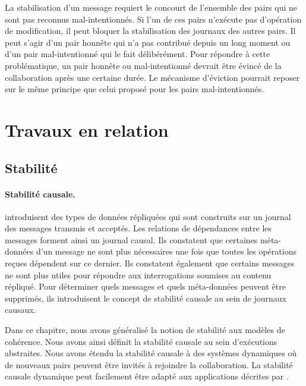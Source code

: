 La stabilisation d'un message requiert le concourt de l'ensemble des pairs qui ne sont pas reconnus mal-intentionnés.
Si l'un de ces pairs n'exécute pas d'opération de modification, il peut bloquer la stabilisation des journaux des autres pairs.
Il peut s'agir d'un pair honnête qui n'a pas contribué depuis un long moment ou d'un pair mal-intentionné qui le fait délibérément.
Pour répondre à cette problématique, un pair honnête ou mal-intentionné devrait être évincé de la collaboration après une certaine durée.
Le mécanisme d'éviction pourrait reposer sur le même principe que celui proposé pour les pairs mal-intentionnés.


\section{Travaux en relation}

\subsection{Stabilité}

\paragraph{Stabilité causale.} \textcite{baquero_2018_pure-op-crdt, baquero_2014_pure-op-crdt} introduisent des types de données répliquées qui sont construits sur un journal des messages transmis et acceptés.
Les relations de dépendances entre les messages forment ainsi un journal causal.
Ils constatent que certaines méta-données d'un message ne sont plus nécessaires une fois que toutes les opérations reçues dépendent sur ce dernier.
Ils constatent également que certains messages ne sont plus utiles pour répondre aux interrogations soumises au contenu répliqué.
Pour déterminer quels messages et quels méta-données peuvent être supprimés, ils introduisent le concept de stabilité causale au sein de journaux causaux.

Dans ce chapitre, nous avons généralisé la notion de stabilité aux modèles de cohérence.
Nous avons ainsi définit la stabilité causale au sein d'exécutions abstraites.
Nous avons étendu la stabilité causale à des systèmes dynamiques où de nouveaux pairs peuvent être invités à rejoindre la collaboration.
La stabilité causale dynamique peut facilement être adapté aux applications décrites par \textcite{baquero_2018_pure-op-crdt}.

